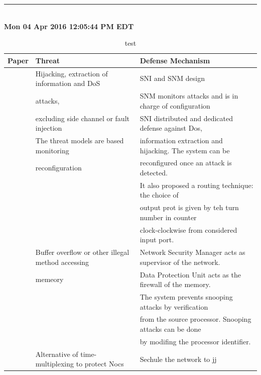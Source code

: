 \documentclass[]{article}
\begin{document}
\rule[-0.1cm]{7.5in}{0.01cm}\\
\noindent \textbf{Mon 04 Apr 2016 12:05:44 PM EDT}
\begin{table}[!t]
	\centering
	\begin{tabular}{c l l}
		Paper & Threat & Defense Mechanism\\
	\hline
	~\cite{diguet2007noc} 	& Hijacking, extraction of information and DoS  	& SNI and SNM design\\
						  	& attacks,											& SNM monitors attacks and is in charge of configuration\\
						  	& excluding side channel or fault injection 		& SNI distributed and dedicated defense against Dos,\\
						  	& The threat models are based monitoring  			& information extraction and hijacking. The system can be\\
						  	& reconfiguration									& reconfigured once an attack is detected.\\
							&													& It also proposed a routing technique: the choice of\\
							&													& output prot is given by teh turn number in counter\\
							& 													& clock-clockwise from considered input port.\\
	\hline
	\cite{fiorin2008secure} & Buffer overflow or other illegal method accessing & Network Security Manager acts as supervisor of the network.\\
							& memeory 											& Data Protection Unit acts as the firewall of the memory.\\
							& 													& The system prevents snooping attacks by verification\\
							& 													& from the source processor. Snooping attacks can be done\\
							& 													& by modifing the processor identifier.\\
	\hline
	\cite{wassel2013surfnoc}& Alternative of time-multiplexing to protect Nocs  & Sechule the network to jj\\
	\end{tabular}
	\caption{test}
\end{table}




{}

\end{document}
